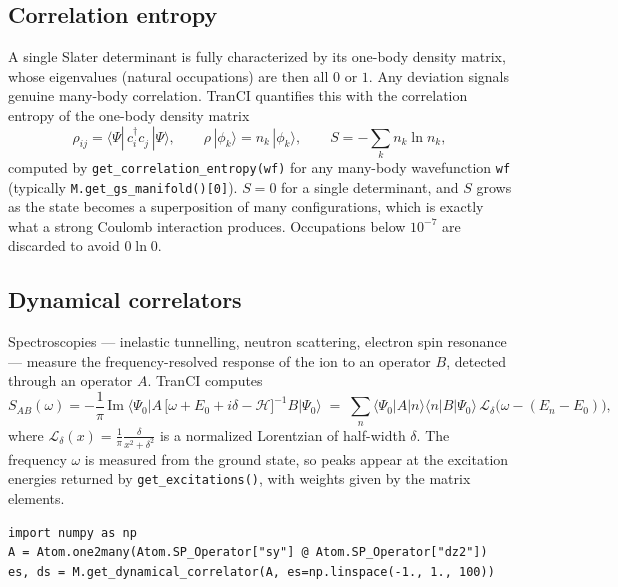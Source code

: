 \documentclass[11pt,a4paper]{article}
\newcommand{\op}[1]{\texttt{#1}}
\newcommand{\cd}[1]{c^{\dagger}_{#1}}
\newcommand{\cc}[1]{c^{\phantom{\dagger}}_{#1}}
\begin{document}
\subsection{Correlation entropy}

A single Slater determinant is fully characterized by its one-body density
matrix, whose eigenvalues (natural occupations) are then all $0$ or $1$.  Any
deviation signals genuine many-body correlation.  TranCI quantifies this with
the correlation entropy of the one-body density matrix
\begin{equation}
  \rho_{ij}=\langle \Psi |\, \cd{i}\cc{j}\, |\Psi\rangle ,
  \qquad
  \rho\,|\phi_k\rangle = n_k\,|\phi_k\rangle ,
  \qquad
  S = -\sum_k n_k \ln n_k ,
\end{equation}
computed by \op{get\_correlation\_entropy(wf)} for any many-body wavefunction
\op{wf} (typically \op{M.get\_gs\_manifold()[0]}).  $S=0$ for a single
determinant, and $S$ grows as the state becomes a superposition of many
configurations, which is exactly what a strong Coulomb interaction produces.
Occupations below $10^{-7}$ are discarded to avoid $0\ln 0$.

\subsection{Dynamical correlators}

Spectroscopies --- inelastic tunnelling, neutron scattering, electron spin
resonance --- measure the frequency-resolved response of the ion to an operator
$B$, detected through an operator $A$.  TranCI computes
\begin{equation}
  S_{AB}(\omega)
  = -\frac{1}{\pi}\,\mathrm{Im}\;
    \big\langle \Psi_0 \big| A\,
    \big[\omega + E_0 + i\delta - \mathcal{H}\big]^{-1} B
    \big|\Psi_0\big\rangle
  \;=\;\sum_n \langle \Psi_0|A|n\rangle\langle n|B|\Psi_0\rangle\,
        \mathcal{L}_\delta\!\big(\omega - (E_n-E_0)\big),
  \label{eq:dyn}
\end{equation}
where
$\mathcal{L}_\delta(x)=\frac{1}{\pi}\frac{\delta}{x^2+\delta^2}$
is a normalized Lorentzian of half-width $\delta$.  The frequency $\omega$ is
measured from the ground state, so peaks appear at the excitation energies
returned by \op{get\_excitations()}, with weights given by the matrix elements.

\begin{lstlisting}
import numpy as np
A = Atom.one2many(Atom.SP_Operator["sy"] @ Atom.SP_Operator["dz2"])
es, ds = M.get_dynamical_correlator(A, es=np.linspace(-1., 1., 100))
\end{lstlisting}
\end{document}
